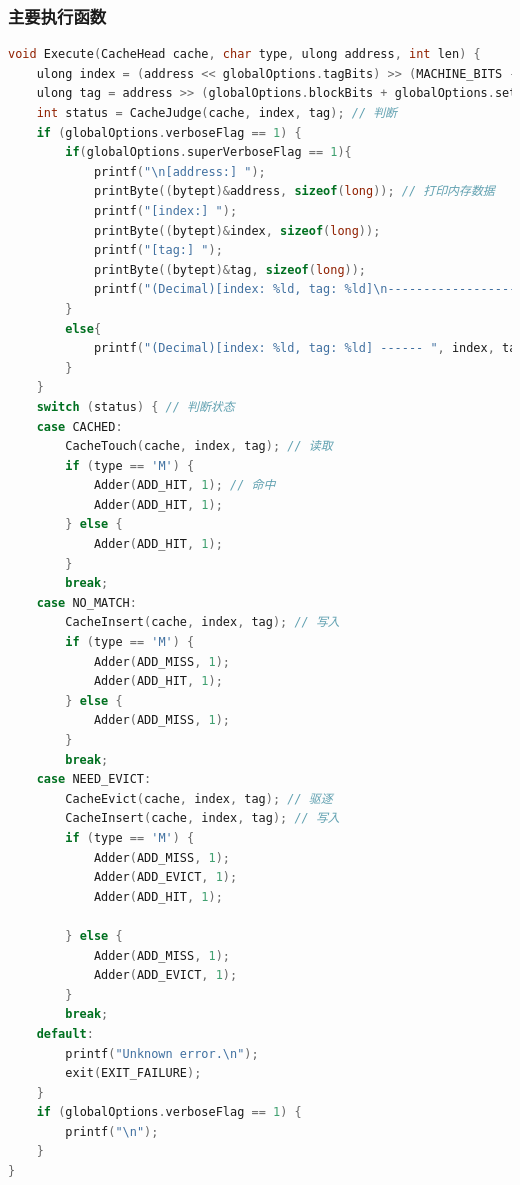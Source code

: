 \subsubsection{主要执行函数}
\begin{lstlisting}[language = C , title = {Execute Function} ]
void Execute(CacheHead cache, char type, ulong address, int len) {
    ulong index = (address << globalOptions.tagBits) >> (MACHINE_BITS - globalOptions.setIndexBits); // 索引
    ulong tag = address >> (globalOptions.blockBits + globalOptions.setIndexBits); // 标志
    int status = CacheJudge(cache, index, tag); // 判断
    if (globalOptions.verboseFlag == 1) {
        if(globalOptions.superVerboseFlag == 1){
            printf("\n[address:] ");
            printByte((bytept)&address, sizeof(long)); // 打印内存数据
            printf("[index:] ");
            printByte((bytept)&index, sizeof(long));
            printf("[tag:] ");
            printByte((bytept)&tag, sizeof(long));
            printf("(Decimal)[index: %ld, tag: %ld]\n------------------------------------------- ", index, tag);
        } 
        else{
            printf("(Decimal)[index: %ld, tag: %ld] ------ ", index, tag);
        }
    }
    switch (status) { // 判断状态
    case CACHED:
        CacheTouch(cache, index, tag); // 读取
        if (type == 'M') {
            Adder(ADD_HIT, 1); // 命中
            Adder(ADD_HIT, 1);
        } else {
            Adder(ADD_HIT, 1);
        }
        break;
    case NO_MATCH:
        CacheInsert(cache, index, tag); // 写入
        if (type == 'M') {
            Adder(ADD_MISS, 1);
            Adder(ADD_HIT, 1);
        } else {
            Adder(ADD_MISS, 1);
        }
        break;
    case NEED_EVICT:
        CacheEvict(cache, index, tag); // 驱逐
        CacheInsert(cache, index, tag); // 写入
        if (type == 'M') {
            Adder(ADD_MISS, 1);
            Adder(ADD_EVICT, 1);
            Adder(ADD_HIT, 1);

        } else {
            Adder(ADD_MISS, 1);
            Adder(ADD_EVICT, 1);
        }
        break;
    default:
        printf("Unknown error.\n");
        exit(EXIT_FAILURE);
    }
    if (globalOptions.verboseFlag == 1) {
        printf("\n");
    }
}

\end{lstlisting}

